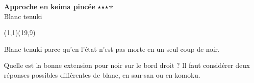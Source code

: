 \documentclass[preview, border=0pt, varwidth=false]{standalone}
\begin{document}
	\setgounit{0.4cm} 
	
\parbox[c][14.65cm][c]{10.2cm}{
	\centering
	
	{\Large\textbf{Approche en keima pincée} $\medblackstar \medblackstar \medblackstar \medwhitestar$ \\ Blanc tenuki}
	\vspace{3em}
	
	\begin{psgopartialboard}{(1,1)(19,9)}
		\pass
	\end{psgopartialboard}
	
	\vspace{1em}
	Blanc tenuki parce qu'en l'état  n'est pas morte en un seul coup de noir.  \\

	\bigskip

	Quelle est la bonne extension pour noir sur le bord droit ? Il faut considérer deux réponses possibles différentes de blanc, en san-san ou en komoku.
}
\end{document}
